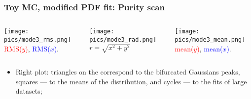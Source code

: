 \documentclass[10 pt,compress,mathserif]{beamer}
\begin{document}
\begin{frame}
 \frametitle{Toy MC, modified PDF fit: Purity scan}
 \begin{small} 
 \begin{columns}
  \begin{column}{0.33\textwidth}
  \begin{center}
   \texttt{[image: pics/mode3\_rms.png]}\\
   \textcolor{red}{RMS($y$)}, \textcolor{blue}{RMS($x$)}.
  \end{center}
  \end{column}
  \begin{column}{0.33\textwidth}
  \begin{center}
   \texttt{[image: pics/mode3\_rad.png]}\\
   $r=\sqrt{x^2+y^2}$
  \end{center}
  \end{column}
  \begin{column}{0.33\textwidth}
  \begin{center}
   \texttt{[image: pics/mode3\_mean.png]}\\
   \textcolor{red}{mean($y$)}, \textcolor{blue}{mean($x$)}.
  \end{center}
  \end{column}
 \end{columns}
 
 \begin{itemize}
  \item Right plot: triangles on the correspond to the bifurcated Gaussians peaks, squares --- to the means of the distribution, and cycles --- to the fits of large datasets;
 \end{itemize}

 \end{small}
\end{frame}
\end{document}
